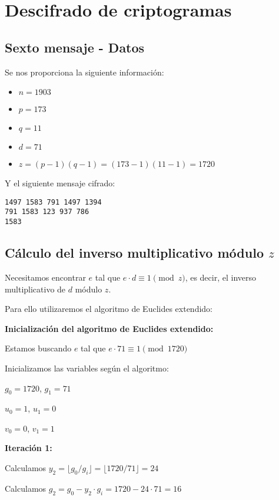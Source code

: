 \section{Descifrado de criptogramas}

\subsection{Sexto mensaje - Datos}

Se nos proporciona la siguiente información:

\begin{itemize}
\item $n = 1903$
\item $p = 173$
\item $q = 11$
\item $d = 71$
\item $z = (p-1)(q-1) = (173-1)(11-1) = 1720$
\end{itemize}

Y el siguiente mensaje cifrado:

\begin{verbatim}
1497 1583 791 1497 1394
791 1583 123 937 786
1583
\end{verbatim}

\subsection{Cálculo del inverso multiplicativo módulo $z$}

Necesitamos encontrar $e$ tal que $e \cdot d \equiv 1 \pmod{z}$, es decir, el inverso multiplicativo de $d$ módulo $z$.

Para ello utilizaremos el algoritmo de Euclides extendido:

\textbf{Inicialización del algoritmo de Euclides extendido:}

Estamos buscando $e$ tal que $e \cdot 71 \equiv 1 \pmod{1720}$

Inicializamos las variables según el algoritmo:

$g_0 = 1720$, $g_1 = 71$

$u_0 = 1$, $u_1 = 0$

$v_0 = 0$, $v_1 = 1$



\textbf{Iteración 1:}

Calculamos $y_2 = \lfloor g_0 / g_i \rfloor = \lfloor 1720 / 71 \rfloor = 24$

Calculamos $g_2 = g_0 - y_2 \cdot g_i = 1720 - 24 \cdot 71 = 16$

